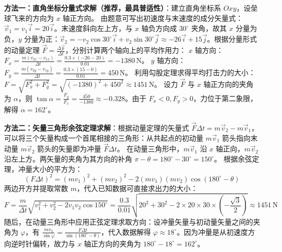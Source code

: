 \documentclass[lang=cn,11pt]{elegantbook}
\begin{document}
\begin{solution}
\textbf{方法一：直角坐标分量式求解（推荐，最具普适性）}：建立直角坐标系 $Oxy$，设垒球飞来的方向为 $x$ 轴正方向。
由题意可写出初速度与末速度的成分矢量式：$\vec{v}_1 = v_1\vec{i} = 20\vec{i}$。末速度斜向左上方，与 $x$ 轴负方向成 $30^\circ$ 夹角，故其 $x$ 分量为负，$y$ 分量为正：$\vec{v}_2 = -v_2\cos 30^\circ\vec{i} + v_2\sin 30^\circ\vec{j} \approx -26\vec{i} + 15\vec{j}$。根据分量形式的动量定理 $\vec{F} = \frac{\Delta\vec{p}}{\Delta t}$，分别计算两个轴向上的平均作用力：
$x$ 轴方向：$F_x = \frac{m(v_{2x} - v_{1x})}{\Delta t} = \frac{0.3 \times (-26 - 20)}{0.01} = -1380\,\mathrm{N}$。
$y$ 轴方向：$F_y = \frac{m(v_{2y} - v_{1y})}{\Delta t} = \frac{0.3 \times (15 - 0)}{0.01} = 450\,\mathrm{N}$。
利用勾股定理求得平均打击力的大小：
$F = \sqrt{F_x^2 + F_y^2} = \sqrt{(-1380)^2 + 450^2} \approx 1451\,\mathrm{N}$。
设力 $\vec{F}$ 与 $x$ 轴正方向的夹角为 $\alpha$，则 $\tan\alpha = \frac{F_y}{F_x} = \frac{450}{-1380} \approx -0.328$。由于 $F_x < 0, F_y > 0$，力位于第二象限，解得 $\alpha = 162^\circ$。

\textbf{方法二：矢量三角形余弦定理求解}：根据动量定理的矢量式 $\vec{F}\Delta t = m\vec{v}_2 - m\vec{v}_1$，可以将三个矢量构成一个首尾相接的三角形：从共起点的初动量 $m\vec{v}_1$ 箭头指向末动量 $m\vec{v}_2$ 箭头的矢量即为冲量 $\vec{F}\Delta t$。
在动量三角形中，$m\vec{v}_1$ 沿 $x$ 轴正向，$m\vec{v}_2$ 沿左上方。两矢量的夹角为其方向的补角 $\pi - \theta = 180^\circ - 30^\circ = 150^\circ$。
根据余弦定理，冲量大小的平方为：
\[(F\Delta t)^2 = (mv_1)^2 + (mv_2)^2 - 2(mv_1)(mv_2)\cos(180^\circ - \theta)\]
两边开方并提取常数 $m$，代入已知数据可直接求出力的大小：
\[F = \frac{m}{\Delta t}\sqrt{v_1^2 + v_2^2 - 2v_1v_2\cos 150^\circ} = \frac{0.3}{0.01}\sqrt{20^2 + 30^2 - 2 \times 20 \times 30 \times \left(-\frac{\sqrt{3}}{2}\right)} \approx 1451\,\mathrm{N}\]
随后，在动量三角形中应用正弦定理求取方向：设冲量矢量与初动量矢量之间的夹角为 $\varphi$，有 $\frac{mv_2}{\sin\varphi} = \frac{F\Delta t}{\sin(180^\circ - \theta)}$，代入数据解得 $\varphi \approx 18^\circ$。因为冲量是从初速度方向逆时针偏转，故力与 $x$ 轴正方向的夹角为 $180^\circ - 18^\circ = 162^\circ$。
\end{solution}
\end{document}
